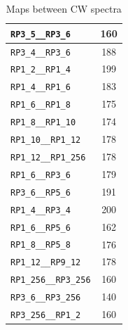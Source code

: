 \begin{table}
\begin{tabular}{|l|c|}
\texttt{RP3\_5\_\_RP3\_6} & 160\\\hline
\texttt{RP3\_4\_\_RP3\_6} & 188\\\hline
\texttt{RP1\_2\_\_RP1\_4} & 199\\\hline
\texttt{RP1\_4\_\_RP1\_6} & 183\\\hline
\texttt{RP1\_6\_\_RP1\_8} & 175\\\hline
\texttt{RP1\_8\_\_RP1\_10} & 174\\\hline
\texttt{RP1\_10\_\_RP1\_12} & 178\\\hline
\texttt{RP1\_12\_\_RP1\_256} & 178\\\hline
\texttt{RP1\_6\_\_RP3\_6} & 179\\\hline
\texttt{RP3\_6\_\_RP5\_6} & 191\\\hline
\texttt{RP1\_4\_\_RP3\_4} & 200\\\hline
\texttt{RP1\_6\_\_RP5\_6} & 162\\\hline
\texttt{RP1\_8\_\_RP5\_8} & 176\\\hline
\texttt{RP1\_12\_\_RP9\_12} & 178\\\hline
\texttt{RP1\_256\_\_RP3\_256} & 160\\\hline
\texttt{RP3\_6\_\_RP3\_256} & 140\\\hline
\texttt{RP3\_256\_\_RP1\_2} & 160\\\hline
\end{tabular}\caption{Maps between CW spectra}\label{tb:map2}
\end{table}
